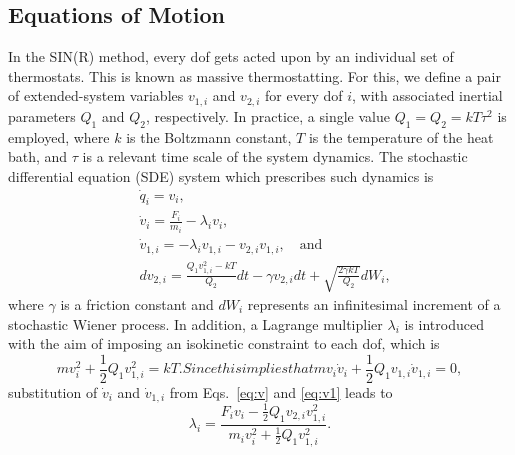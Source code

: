 \documentclass[
    journal=jctcce,
    layout=twocolumn
]{achemso}
\newcommand{\dof}{i}   %
\begin{document}
\subsection{Equations of Motion}

In the SIN(R) method, every dof gets acted upon by an individual set of thermostats.
This is known as massive thermostatting.
For this, we define a pair of extended-system variables $v_{1,\dof}$ and $v_{2,\dof}$ for every dof $\dof$, with associated inertial parameters $Q_1$ and $Q_2$, respectively.
In practice, a single value $Q_1 = Q_2 = kT\tau^2$ is employed, where $k$ is the Boltzmann constant, $T$ is the temperature of the heat bath, and $\tau$ is a relevant time scale of the system dynamics.
The stochastic differential equation (SDE) system which prescribes such dynamics is
\begin{subequations}
\label{eq:equations of motion}
\begin{align}
& \dot{q}_\dof = v_\dof, \label{eq:q} \\
& \dot{v}_\dof = \frac{F_\dof}{m_\dof} - \lambda_\dof v_\dof, \label{eq:v} \\
& \dot{v}_{1,\dof} = - \lambda_\dof v_{1,\dof} - v_{2,\dof} v_{1,\dof}, \quad \mathrm{and}  \label{eq:v1} \\
& dv_{2,\dof} = \tfrac{Q_1 v_{1,\dof}^2 - kT}{Q_2}dt - \gamma v_{2,\dof} dt + \sqrt{\tfrac{2 \gamma kT}{Q_2}} dW_\dof, \label{eq:v2}
\end{align}
\end{subequations}
where $\gamma$ is a friction constant and $dW_\dof$ represents an infinitesimal increment of a stochastic Wiener process.
In addition, a Lagrange multiplier $\lambda_\dof$ is introduced with the aim of imposing an isokinetic constraint to each dof, which is \cite{Leimkuhler_2013, Margul_2016}
\begin{subequations}
\label{eq:isokinetic constraint}
\begin{equation}
m v_\dof^2 + \frac{1}{2} Q_1 v_{1,\dof}^2 = kT.
\end{equation}

Since this implies that
\begin{equation}
\label{eq:isokinetic constraint derivative}
m v_\dof \dot{v}_\dof + \frac{1}{2} Q_1 v_{1,\dof}\dot{v}_{1,\dof} = 0,
\end{equation}
\end{subequations}
substitution of $\dot{v}_\dof$ and $\dot{v}_{1,\dof}$ from Eqs.~\eqref{eq:v} and \eqref{eq:v1} leads to
\begin{equation}
\lambda_\dof = \frac{F_\dof v_\dof - \frac{1}{2} Q_1 v_{2,\dof} v_{1,\dof}^2}{m_\dof v_\dof^2 + \frac{1}{2} Q_1 v_{1,\dof}^2}.
\end{equation}
\end{document}
